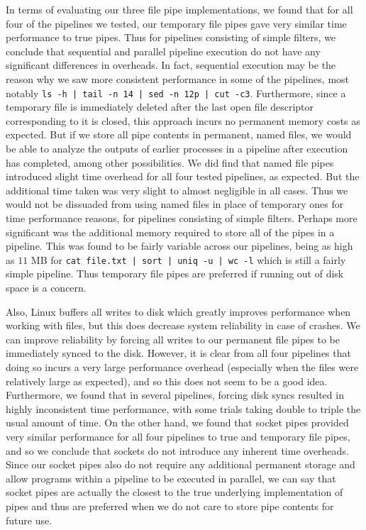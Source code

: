 In terms of evaluating our three file pipe implementations, we found that for all four of the pipelines we tested, our temporary file pipes gave very similar time performance to true pipes. Thus for pipelines consisting of simple filters, we conclude that sequential and parallel pipeline execution do not have any significant differences in overheads. In fact, sequential execution may be the reason why we saw more consistent performance in some of the pipelines, most notably \texttt{ls -h |  tail -n 14 | sed -n 12p | cut -c3}.  Furthermore, since a temporary file is immediately deleted after the last open file descriptor corresponding to it is closed, this approach incurs no permanent memory costs as expected. But if we store all pipe contents in permanent, named files, we would be able to analyze the outputs of earlier processes in a pipeline after execution has completed, among other possibilities. We did find that named file pipes introduced slight time overhead for all four tested pipelines, as expected. But the additional time taken was very slight to almost negligible in all cases. Thus we would not be dissuaded from using named files in place of temporary ones for time performance reasons, for pipelines consisting of simple filters. Perhaps more significant was the additional memory required to store all of the pipes in a pipeline. This was found to be fairly variable across our pipelines, being as high as $11$ MB for \texttt{cat file.txt | sort | uniq -u | wc -l} which is still a fairly simple pipeline. Thus temporary file pipes are preferred if running out of disk space is a concern. 

Also, Linux buffers all writes to disk which greatly improves performance when working with files, but this does decrease system reliability in case of crashes. We can improve reliability by forcing all writes to our permanent file pipes to be immediately synced to the disk. However, it is clear from all four pipelines that doing so incurs a very large performance overhead (especially when the files were relatively large as expected), and so this does not seem to be a good idea. Furthermore, we found that in several pipelines, forcing disk syncs resulted in highly inconsistent time performance, with some trials taking double to triple the usual amount of time. On the other hand, we found that socket pipes provided very similar performance for all four pipelines to true and temporary file pipes, and so we conclude that sockets do not introduce any inherent time overheads. Since our socket pipes also do not require any additional permanent storage and allow programs within a pipeline to be executed in parallel, we can say that socket pipes are actually the closest to the true underlying implementation of pipes and thus are preferred when we do not care to store pipe contents for future use.

